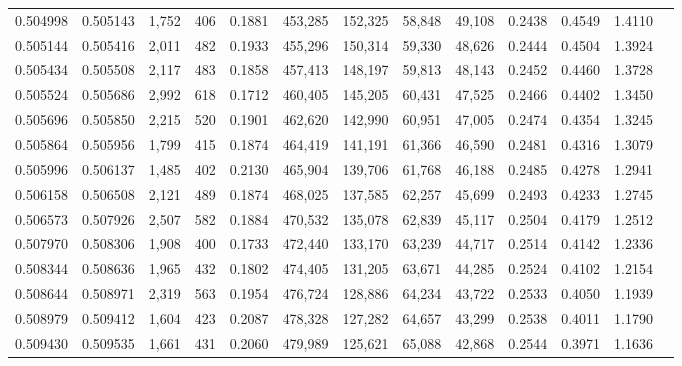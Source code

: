 \begin{tabular}{rrrrrrrrrrrrr}
0.504998 & 0.505143 & 1,752 &   406 &                                     0.1881 & 453,285 & 152,325 &  58,848 &  49,108 & 0.2438 & 0.4549 & 1.4110 \\
0.505144 & 0.505416 & 2,011 &   482 &                                     0.1933 & 455,296 & 150,314 &  59,330 &  48,626 & 0.2444 & 0.4504 & 1.3924 \\
0.505434 & 0.505508 & 2,117 &   483 &                                     0.1858 & 457,413 & 148,197 &  59,813 &  48,143 & 0.2452 & 0.4460 & 1.3728 \\
0.505524 & 0.505686 & 2,992 &   618 &                                     0.1712 & 460,405 & 145,205 &  60,431 &  47,525 & 0.2466 & 0.4402 & 1.3450 \\
0.505696 & 0.505850 & 2,215 &   520 &                                     0.1901 & 462,620 & 142,990 &  60,951 &  47,005 & 0.2474 & 0.4354 & 1.3245 \\
0.505864 & 0.505956 & 1,799 &   415 &                                     0.1874 & 464,419 & 141,191 &  61,366 &  46,590 & 0.2481 & 0.4316 & 1.3079 \\
0.505996 & 0.506137 & 1,485 &   402 &                                     0.2130 & 465,904 & 139,706 &  61,768 &  46,188 & 0.2485 & 0.4278 & 1.2941 \\
0.506158 & 0.506508 & 2,121 &   489 &                                     0.1874 & 468,025 & 137,585 &  62,257 &  45,699 & 0.2493 & 0.4233 & 1.2745 \\
0.506573 & 0.507926 & 2,507 &   582 &                                     0.1884 & 470,532 & 135,078 &  62,839 &  45,117 & 0.2504 & 0.4179 & 1.2512 \\
0.507970 & 0.508306 & 1,908 &   400 &                                     0.1733 & 472,440 & 133,170 &  63,239 &  44,717 & 0.2514 & 0.4142 & 1.2336 \\
0.508344 & 0.508636 & 1,965 &   432 &                                     0.1802 & 474,405 & 131,205 &  63,671 &  44,285 & 0.2524 & 0.4102 & 1.2154 \\
0.508644 & 0.508971 & 2,319 &   563 &                                     0.1954 & 476,724 & 128,886 &  64,234 &  43,722 & 0.2533 & 0.4050 & 1.1939 \\
0.508979 & 0.509412 & 1,604 &   423 &                                     0.2087 & 478,328 & 127,282 &  64,657 &  43,299 & 0.2538 & 0.4011 & 1.1790 \\
0.509430 & 0.509535 & 1,661 &   431 &                                     0.2060 & 479,989 & 125,621 &  65,088 &  42,868 & 0.2544 & 0.3971 & 1.1636 \\

\end{tabular}
